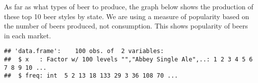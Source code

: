 \documentclass[]{article}
\newenvironment{Shaded}{\begin{snugshade}}{\end{snugshade}}
\newcommand{\KeywordTok}[1]{\textcolor[rgb]{0.13,0.29,0.53}{\textbf{#1}}}
\newcommand{\NormalTok}[1]{#1}
\newcommand{\OperatorTok}[1]{\textcolor[rgb]{0.81,0.36,0.00}{\textbf{#1}}}
\newcommand{\StringTok}[1]{\textcolor[rgb]{0.31,0.60,0.02}{#1}}
\begin{document}
As far as what types of beer to produce, the graph below shows the
production of these top 10 beer styles by state. We are using a measure
of popularity based on the number of beers produced, not consumption.
This shows popularity of beers in each market.

\begin{Shaded}
\end{Shaded}

\begin{verbatim}
## 'data.frame':    100 obs. of  2 variables:
##  $ x   : Factor w/ 100 levels "","Abbey Single Ale",..: 1 2 3 4 5 6 7 8 9 10 ...
##  $ freq: int  5 2 13 18 133 29 3 36 108 70 ...
\end{verbatim}
\end{document}
